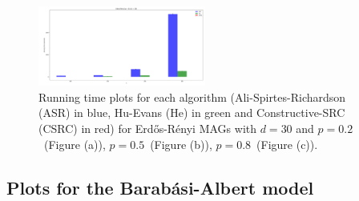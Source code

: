 \documentclass[a4paper]{article}
\begin{document}
\begin{figure}[htbp]
	\centering
	\hfill
	
	\includegraphics[width=0.49\textwidth]{figures/Figure_15.png}
	
	\caption{Running time plots for each algorithm (Ali-Spirtes-Richardson (ASR) in blue, Hu-Evans (He) in green and Constructive-SRC (CSRC) in red) for Erd\H{o}s-R\'{e}nyi MAGs with $d=30$ and $p=0.2$~(Figure (a)), $p=0.5$~(Figure (b)), $p=0.8$~(Figure (c)).}
	\label{fig:er-30-ap}
\end{figure}

\pagebreak
\subsection{Plots for the Barab\'{a}si-Albert model}
\end{document}
